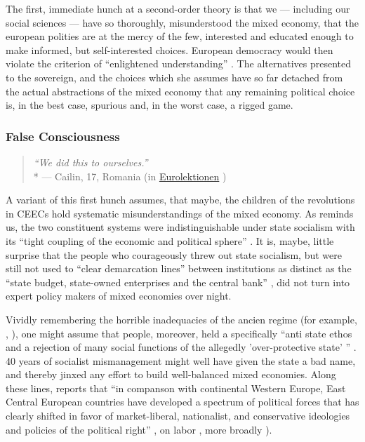 The first, immediate hunch at a second-order theory is that we --- including our social sciences --- have so thoroughly, misunderstood the mixed economy, that the european polities are at the mercy of the few, interested and educated enough to make informed, but self-interested choices.
European democracy would then violate the criterion of ``enlightened understanding'' \citep{Dahl-1989-aa}.
The alternatives presented to the sovereign, and the choices which she assumes have so far detached from the actual abstractions of the mixed economy that any remaining political choice is, in the best case, spurious and, in the worst case, a rigged game.

\subsubsection[False Consciousness]{False Consciousness}

\begin{quote}
	\emph{``We did this to ourselves.''}
	\\*
	--- Cailin, 17, Romania (in \href{http://eurolektionen.de}{Eurolektionen} \citeyear{DeRuffray2010})
\end{quote}

A variant of this first hunch assumes, that maybe, the children of the revolutions in \glspl{CEEC} hold systematic misunderstandings of the mixed economy.
As \citeauthor{Bonker2006} reminds us, the two constituent systems were indistinguishable under state socialism with its ``tight coupling of the economic and political sphere'' \citeyearpar[35]{Bonker2006}.
It is, maybe, little surprise that the people who courageously threw out state socialism, but were still not used to ``clear demarcation lines'' between institutions as distinct as the ``state budget, state-owned enterprises and the central bank'' \citeyearpar[36]{Bonker2006}, did not turn into expert policy makers of mixed economies over night.

Vividly remembering the horrible inadequacies of the ancien regime (for example, \citealt{Szikra2009}, \citealt{Millard1992}), one might assume that people, moreover, held a specifically  ``anti state ethos and a rejection of many social functions of the allegedly 'over-protective state' '' \citeyearpar[130]{Millard1992}.
40 years of socialist mismanagement might well have given the state a bad name, and thereby jinxed any effort to build well-balanced mixed economies.
Along these lines, \citeauthor{Inglot2008} reports that ``in companson with continental Western Europe, East Central European countries have developed a spectrum of political forces that has clearly shifted in favor of market-liberal, nationalist, and conservative ideologies and policies of the political right'' \citeyearpar[212]{Inglot2008}, on labor \citealt{Crowley2002}, more broadly \citealt{OrenOuto2001}).

